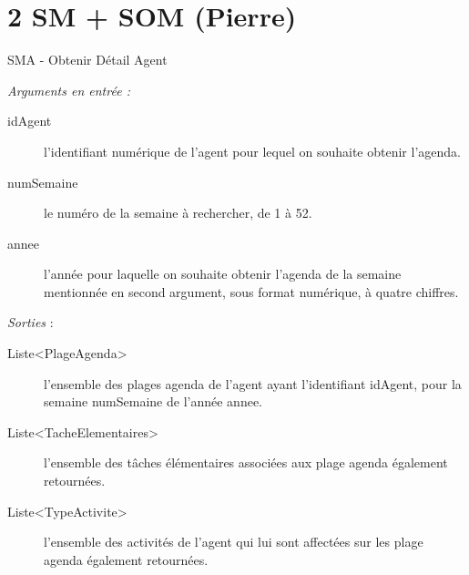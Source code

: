\documentclass[xetex]{beamer}
\begin{document}
    \section{2 SM + SOM (Pierre)}
    \begin{frame}{SMA - Obtenir Détail Agent}
   \begin{small}
            \noindent \textit{\textit{Arguments en entrée :}}
\begin{description}
\item[idAgent] l'identifiant numérique de  l'agent pour lequel on souhaite obtenir l'agenda. 
\item[numSemaine] le numéro de la semaine à rechercher, de 1 à 52. 
\item[annee] l'année pour laquelle on souhaite obtenir l'agenda de la semaine mentionnée en second argument, sous format numérique, à quatre chiffres. \\
\end{description}

\noindent \textit{Sorties} :

\begin{description}
\item[Liste<PlageAgenda>] l'ensemble des plages agenda de l'agent ayant l'identifiant idAgent, pour la semaine numSemaine de l'année annee.
\item[Liste<TacheElementaires>] l'ensemble des tâches élémentaires associées aux plage agenda également retournées. 
\item[Liste<TypeActivite>] l'ensemble des activités de l'agent qui lui sont affectées sur les plage agenda également retournées. \\
\end{description}
   \end{small}
    \end{frame}
\end{document}
